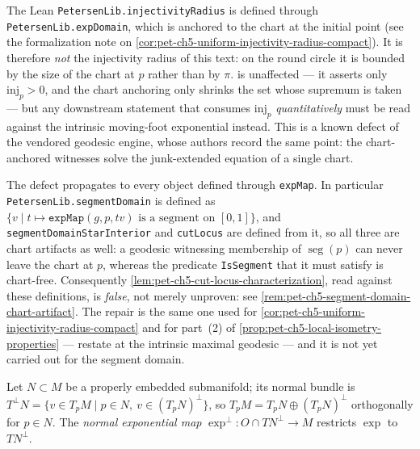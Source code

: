 \begin{remark}
  \label{rem:pet-ch5-injectivity-radius-chart-artifact}
  The Lean \texttt{PetersenLib.injectivityRadius} is defined through
  \texttt{PetersenLib.expDomain}, which is anchored to the chart at the initial
  point (see the formalization note on
  \cref{cor:pet-ch5-uniform-injectivity-radius-compact}).  It is therefore
  \emph{not} the injectivity radius of this text: on the round circle it is bounded
  by the size of the chart at $p$ rather than by $\pi$.
   is unaffected — it asserts only
  $\mathrm{inj}_p>0$, and the chart anchoring only shrinks the set whose supremum
  is taken — but any downstream statement that consumes $\mathrm{inj}_p$
  \emph{quantitatively} must be read against the intrinsic moving-foot exponential
  instead.  This is a known defect of the vendored geodesic engine, whose authors
  record the same point: the chart-anchored witnesses solve the junk-extended
  equation of a single chart.

  The defect propagates to every object defined through \texttt{expMap}.  In
  particular \texttt{PetersenLib.segmentDomain} is defined as
  $\{v\mid t\mapsto\texttt{expMap}(g,p,tv)\text{ is a segment on }[0,1]\}$, and
  \texttt{segmentDomainStarInterior} and \texttt{cutLocus} are defined from it, so
  all three are chart artifacts as well: a geodesic witnessing membership of
  $\operatorname{seg}(p)$ can never leave the chart at $p$, whereas the predicate
  \texttt{IsSegment} that it must satisfy is chart-free.  Consequently
  \cref{lem:pet-ch5-cut-locus-characterization}, read against these definitions, is
  \emph{false}, not merely unproven: see
  \cref{rem:pet-ch5-segment-domain-chart-artifact}.  The repair is the same one
  used for \cref{cor:pet-ch5-uniform-injectivity-radius-compact} and for part~(2)
  of \cref{prop:pet-ch5-local-isometry-properties} — restate at the intrinsic
  maximal geodesic — and it is not yet carried out for the segment domain.
\end{remark}

\begin{definition}
  \label{def:pet-ch5-normal-exponential-map}


  Let $N\subset M$ be a properly embedded submanifold; its normal bundle is
  $T^\perp N=\{v\in T_pM\mid p\in N,\ v\in(T_pN)^\perp\}$, so $T_pM=T_pN\oplus
  (T_pN)^\perp$ orthogonally for $p\in N$. The \emph{normal exponential map}
  $\exp^\perp:O\cap TN^\perp\to M$ restricts $\exp$ to $TN^\perp$.
\end{definition}

